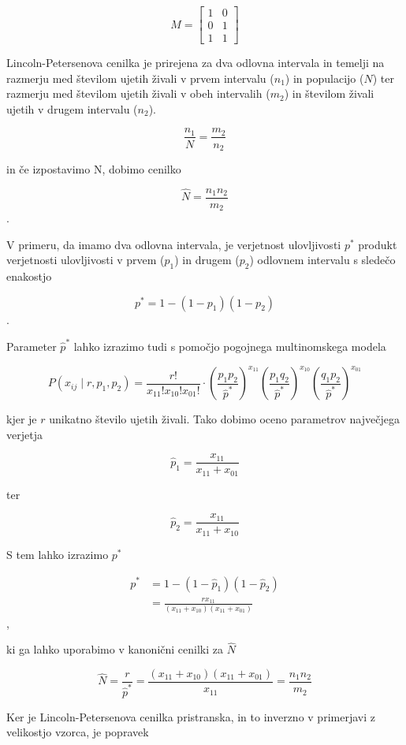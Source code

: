 \[
M = \begin{bmatrix}
1&0\\
0 & 1 \\
1 & 1
\end{bmatrix}
\]

Lincoln-Petersenova cenilka \citep{williams_analysis_2002} je prirejena za dva odlovna intervala in temelji na razmerju med številom ujetih živali v prvem intervalu ($n_1$) in populacijo ($N$) ter razmerju med številom ujetih živali v obeh intervalih ($m_2$) in številom živali ujetih v drugem intervalu ($n_2$).

\[
\frac{n_1}{N} = \frac{m_2}{n_2}
\]

in če izpostavimo N, dobimo cenilko

\[
\hat{N} = \frac{n_1 n_2}{m_2}
\].

V primeru, da imamo dva odlovna intervala, je verjetnost ulovljivosti $p^{*}$ produkt verjetnosti ulovljivosti v prvem ($p_1$) in drugem ($p_2$) odlovnem intervalu s sledečo enakostjo

\[
p^* = 1 - (1-p_1)(1-p_2)
\].

Parameter $\hat{p}^{*}$ lahko izrazimo tudi s pomočjo pogojnega multinomskega modela

\[
P(x_{ij} \mid r, p_1, p_2) = \frac{r!}{x_{11}! x_{10}! x_{01}!} \cdot (\frac{p_1 p_2}{\hat{p}^{*}})^{x_{11}} (\frac{p_1 q_2}{\hat{p}^{*}})^{x_{10}} (\frac{q_1 p_2}{\hat{p}^{*}})^{x_{01}}
\]

kjer je $r$ unikatno število ujetih živali. Tako dobimo oceno parametrov največjega verjetja

\[
\hat{p}_1 = \frac{x_{11}}{x_{11} + x_{01}}
\]

ter

\[
\hat{p}_2 = \frac{x_{11}}{x_{11} + x_{10}}
\]

S tem lahko izrazimo $p^{*}$

\begin{align*}
p^* &= 1 - (1-\hat{p}_1)(1-\hat{p}_2) \\
    &= \frac{r x_{11}}{(x_{11} + x_{10})(x_{11} + x_{01})}
\end{align*},

ki ga lahko uporabimo v kanonični cenilki za $\hat{N}$

\[
\hat{N} = \frac{r}{\hat{p}^{*}} = \frac{(x_{11} + x_{10})(x_{11} + x_{01})}{x_{11}} = \frac{n_1 n_2}{m_2}
\]

Ker je Lincoln-Petersenova cenilka pristranska, in to inverzno v primerjavi z velikostjo vzorca, je popravek

